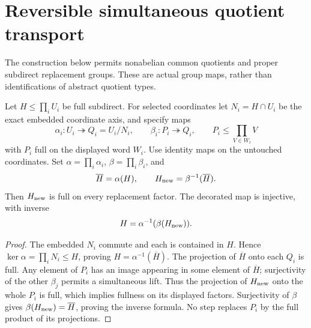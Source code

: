 \section{Reversible simultaneous quotient transport}\label{sec:transport}
The construction below permits nonabelian common quotients and proper
subdirect replacement groups. These are actual group maps, rather than
identifications of abstract quotient types.

\begin{proposition}\label{prop:transport}
Let $H\leq\prod_iU_i$ be full subdirect. For selected coordinates let
$N_i=H\cap U_i$ be the exact embedded coordinate axis, and specify maps
\[
 \alpha_i:U_i\twoheadrightarrow Q_i=U_i/N_i,\qquad
 \beta_i:P_i\twoheadrightarrow Q_i,
 \qquad P_i\leq\prod_{V\in W_i}V
\]
with $P_i$ full on the displayed word $W_i$. Use identity maps on the
untouched coordinates. Set $\alpha=\prod_i\alpha_i$,
$\beta=\prod_i\beta_i$, and
\begin{equation}\label{eq:transport}
 \overline H=\alpha(H),\qquad H_{\rm new}=\beta^{-1}(\overline H).
\end{equation}
Then $H_{\rm new}$ is full on every replacement factor. The decorated
map is injective, with inverse
\begin{equation}\label{eq:transport-inverse}
 H=\alpha^{-1}(\beta(H_{\rm new})).
\end{equation}
\end{proposition}
\begin{proof}
The embedded $N_i$ commute and each is contained in $H$. Hence
$\ker\alpha=\prod_iN_i\leq H$, proving $H=\alpha^{-1}(\overline H)$.
The projection of $\overline H$ onto each $Q_i$ is full. Any element
of $P_i$ has an image appearing in some element of $\overline H$;
surjectivity of the other $\beta_j$ permits a simultaneous lift. Thus
the projection of $H_{\rm new}$ onto the whole $P_i$ is full, which
implies fullness on its displayed factors. Surjectivity of $\beta$
gives $\beta(H_{\rm new})=\overline H$, proving the inverse formula.
No step replaces $P_i$ by the full product of its projections.
\end{proof}


